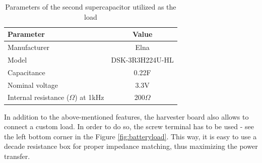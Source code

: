 \documentclass[12pt,a4paper]{article}
\begin{document}
\begin{table}[ht!]
\begin{tabular}{|l|c|}
\hline
\textbf{Parameter}              & \textbf{Value} \\ \hline
Manufacturer & Elna          \\ \hline
Model                 & DSK-3R3H224U-HL\\ \hline
Capacitance                & 0.22F         \\ \hline
Nominal voltage     & 3.3V           \\ \hline
Internal resistance ($\Omega$) at 1kHz     & 200$\Omega$ \\ \hline
\end{tabular}
\caption{Parameters of the second supercapacitor utilized as the load \cite{supercap1params} }
\label{tab:supercap2}
\end{table}
\par

In addition to the above-mentioned features, the harvester board also allows to connect a custom load. In order to do so, the screw terminal has to be used - see the left bottom corner in the Figure \ref{fig:batteryload}. This way, it is easy to use a decade resistance box for proper impedance matching, thus maximizing the power transfer.
\end{document}
